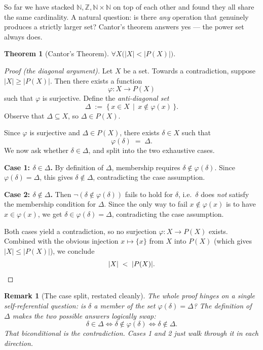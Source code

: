 \documentclass[11pt]{article}
\theoremstyle{defstyle}
\theoremstyle{thmstyle}
\newtheorem{theorem}{Theorem}[section]
\theoremstyle{notstyle}
\newtheorem*{remark}{Remark}
\theoremstyle{cautionstyle}
\newcommand{\Z}{\mathbb{Z}}
\newcommand{\N}{\mathbb{N}}
\begin{document}
So far we have stacked $\N, \Z, \N \times \N$ on top of each other and found
they all share the same cardinality. A natural question: is there \emph{any}
operation that genuinely produces a strictly larger set? Cantor's theorem
answers yes --- the power set always does.

\begin{thmbox}
\begin{theorem}[Cantor's Theorem]
$\forall X \bigl(|X| < |P(X)|\bigr).$
\end{theorem}
\end{thmbox}

\begin{proof}[Proof (the diagonal argument)]
Let $X$ be a set. Towards a contradiction, suppose $|X| \geq |P(X)|$. Then
there exists a function
\[
  \varphi : X \longrightarrow P(X)
\]
such that $\varphi$ is surjective. Define the \emph{anti-diagonal set}
\[
  \Delta \;:=\; \{\, x \in X \,\mid\, x \notin \varphi(x) \,\}.
\]
Observe that $\Delta \subseteq X$, so $\Delta \in P(X)$.

\medskip
Since $\varphi$ is surjective and $\Delta \in P(X)$, there exists
$\delta \in X$ such that
\[
  \varphi(\delta) \;=\; \Delta.
\]
We now ask whether $\delta \in \Delta$, and split into the two exhaustive
cases.

\medskip
\noindent\textbf{Case 1: $\delta \in \Delta$.}\;
By definition of $\Delta$, membership requires $\delta \notin \varphi(\delta)$.
Since $\varphi(\delta) = \Delta$, this gives $\delta \notin \Delta$,
contradicting the case assumption.

\medskip
\noindent\textbf{Case 2: $\delta \notin \Delta$.}\;
Then $\neg(\delta \notin \varphi(\delta))$ fails to hold for $\delta$, i.e.\
$\delta$ does \emph{not} satisfy the membership condition for $\Delta$. Since
the only way to fail $x \notin \varphi(x)$ is to have $x \in \varphi(x)$, we
get $\delta \in \varphi(\delta) = \Delta$, contradicting the case assumption.

\medskip
Both cases yield a contradiction, so no surjection $\varphi : X \to P(X)$
exists. Combined with the obvious injection $x \mapsto \{x\}$ from $X$ into
$P(X)$ (which gives $|X| \leq |P(X)|$), we conclude
\[
  |X| \;<\; |P(X)|. \qedhere
\]
\end{proof}

\begin{notebox}
\begin{remark}[The case split, restated cleanly]
The whole proof hinges on a single self-referential question:
\emph{is $\delta$ a member of the set $\varphi(\delta) = \Delta$?} The
definition of $\Delta$ makes the two possible answers logically swap:
\[
  \delta \in \Delta \iff \delta \notin \varphi(\delta) \iff \delta \notin \Delta.
\]
That biconditional is the contradiction. Cases 1 and 2 just walk through it
in each direction.
\end{remark}
\end{notebox}
\end{document}
